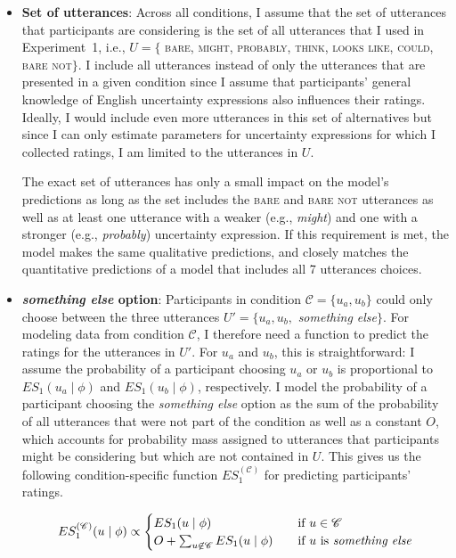 \begin{itemize}
\item \textbf{Set of utterances}: Across all conditions, I assume that the set of utterances that participants are 
considering is the set of all utterances that I used in Experiment~1, i.e., $U= \{$ \textsc{bare}, \textsc{might}, 
\textsc{probably}, \textsc{think}, \textsc{looks like}, \textsc{could}, \textsc{bare not}$\}$. I include all utterances 
instead of only the utterances that are presented in a given condition since I assume that participants' general 
knowledge of English uncertainty expressions also influences their ratings. Ideally, I would include even more 
utterances in this set of alternatives but since I can only estimate parameters for uncertainty expressions for 
which I collected ratings, I am limited to the utterances in $U$. 

The exact set of utterances has only a small impact on the model's predictions as long as the set includes the \textsc{bare}
and \textsc{bare not} utterances as well as at least one utterance with a weaker 
(e.g., \textit{might}) and one with a stronger (e.g., \textit{probably})
uncertainty expression. If this requirement is met, the model makes the same qualitative predictions, 
and closely matches the quantitative predictions of a model that includes all 7 utterances choices.

\item \textbf{\textit{something else} option}: Participants in condition $\mathscr{C} = \{u_a, u_b\}$ 
could only choose between the three utterances $U' = \{u_a, u_b,$ \textit{something else}$\}$.
For modeling data from condition $\mathscr{C}$, I therefore need a function to predict the ratings 
for the utterances in $U'$. For $u_a$ and $u_b$, this is straightforward: I assume the probability 
of a participant choosing $u_a$ or $u_b$
is proportional to $ES_1(u_a \mid \phi)$ and $ES_1(u_b \mid \phi)$, respectively. 
I model the probability of a participant choosing the \textit{something else} option as the sum 
of the probability of all utterances that were not part of the condition as well as a constant $O$, 
which accounts for probability mass assigned to utterances that participants might be 
considering but which are not contained in $U$. This gives us the following condition-specific 
function $ES_1^{(\mathscr{C})}$ for predicting participants' ratings.

$$
ES_1^{(\mathscr{C})}(u \mid \phi) \propto 
    \begin{cases}
      ES_1(u \mid \phi) & \quad\mbox{if } u  \in \mathscr{C}\\
       O + \sum_{u \not \in \mathscr{C}} ES_1(u \mid \phi) & \quad \mbox{if $u$ is \textit{something else}} \\
   \end{cases}
$$


\end{itemize}
